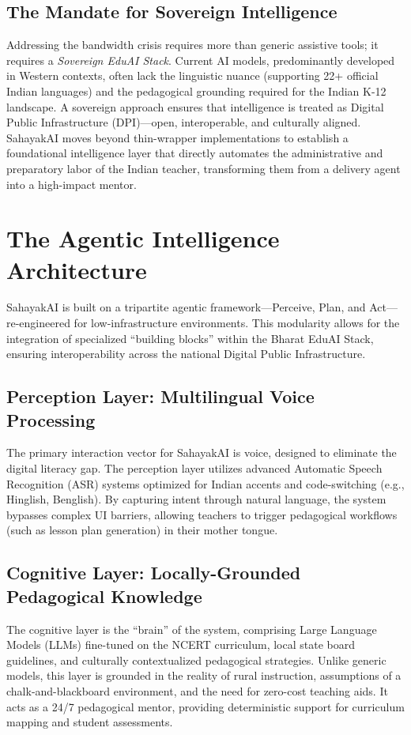 \documentclass[11pt,a4paper]{article}
\begin{document}
\subsection{The Mandate for Sovereign Intelligence}
Addressing the bandwidth crisis requires more than generic assistive tools; it requires a \textit{Sovereign EduAI Stack}. Current AI models, predominantly developed in Western contexts, often lack the linguistic nuance (supporting 22+ official Indian languages) and the pedagogical grounding required for the Indian K-12 landscape. A sovereign approach ensures that intelligence is treated as Digital Public Infrastructure (DPI)---open, interoperable, and culturally aligned. SahayakAI moves beyond thin-wrapper implementations to establish a foundational intelligence layer that directly automates the administrative and preparatory labor of the Indian teacher, transforming them from a delivery agent into a high-impact mentor.

\section{The Agentic Intelligence Architecture}
SahayakAI is built on a tripartite agentic framework---Perceive, Plan, and Act---re-engineered for low-infrastructure environments. This modularity allows for the integration of specialized ``building blocks'' within the Bharat EduAI Stack, ensuring interoperability across the national Digital Public Infrastructure.

\subsection{Perception Layer: Multilingual Voice Processing}
The primary interaction vector for SahayakAI is voice, designed to eliminate the digital literacy gap. The perception layer utilizes advanced Automatic Speech Recognition (ASR) systems optimized for Indian accents and code-switching (e.g., Hinglish, Benglish). By capturing intent through natural language, the system bypasses complex UI barriers, allowing teachers to trigger pedagogical workflows (such as lesson plan generation) in their mother tongue.

\subsection{Cognitive Layer: Locally-Grounded Pedagogical Knowledge}
The cognitive layer is the ``brain'' of the system, comprising Large Language Models (LLMs) fine-tuned on the NCERT curriculum, local state board guidelines, and culturally contextualized pedagogical strategies. Unlike generic models, this layer is grounded in the reality of rural instruction, assumptions of a chalk-and-blackboard environment, and the need for zero-cost teaching aids. It acts as a 24/7 pedagogical mentor, providing deterministic support for curriculum mapping and student assessments.
\end{document}
